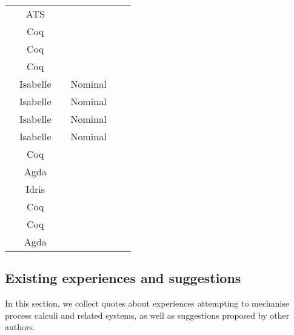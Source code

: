 \begin{center}
\begin{tabular}{l|c|c|c|c|l}
  \cite{Xi2016}                      & ATS                    &           &         &             &             \\
  \cite{Hirsch2022}                  & Coq                    &           &         &             &             \\
  \cite{Cruz-Filipe2021b}            & Coq                    &           &         &             &             \\
  \cite{Maksimovic2015}              & Coq                    &           &         &             &             \\
  \cite{Parrow2014}                  & Isabelle               &           & Nominal &             &             \\
  \cite{Bengtson2016}                & Isabelle               &           & Nominal &             &             \\
  \cite{Kahsai2008}                  & Isabelle               &           & Nominal &             &             \\
  \cite{Bengtson2007}                & Isabelle               &           & Nominal &             &             \\
  \cite{Castro-Perez2021}            & Coq                    &           &         &             &             \\
  \cite{Gay2020}                     & Agda                   &           &         &             &             \\
  \cite{Brady2017}                   & Idris                  &           &         &             &             \\
  \cite{Hinrichsen2019}              & Coq                    &           &         &             &             \\
  \cite{Sergey2017}                  & Coq                    &           &         &             &             \\
  \cite{DBLP:conf/forte/ZalakainD21} & Agda                   &           &         &             & 
\end{tabular}
\end{center}

\subsection{Existing experiences and suggestions}
In this section, we collect quotes about experiences attempting to mechanise process calculi and related systems, as well as suggestions proposed by other authors.

